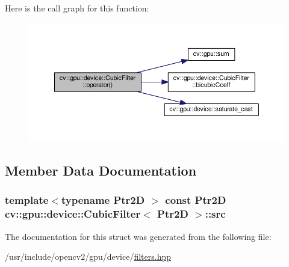 Here is the call graph for this function\-:\nopagebreak
\begin{figure}[H]
\begin{center}
\leavevmode
\includegraphics[width=350pt]{structcv_1_1gpu_1_1device_1_1CubicFilter_a5294b55c0f0108f36ff83ebe73aad1a3_cgraph}
\end{center}
\end{figure}




\subsection{Member Data Documentation}
\hypertarget{structcv_1_1gpu_1_1device_1_1CubicFilter_a174b1388cc09fe57c4ffb92836b53638}{
\subsubsection[{src}]{\setlength{\rightskip}{0pt plus 5cm}template$<$typename Ptr2\-D $>$ const Ptr2\-D {\bf cv\-::gpu\-::device\-::\-Cubic\-Filter}$<$ Ptr2\-D $>$\-::src}}\label{structcv_1_1gpu_1_1device_1_1CubicFilter_a174b1388cc09fe57c4ffb92836b53638}


The documentation for this struct was generated from the following file\-:\begin{DoxyCompactItemize}
\item 
/usr/include/opencv2/gpu/device/\hyperlink{filters_8hpp}{filters.\-hpp}\end{DoxyCompactItemize}
